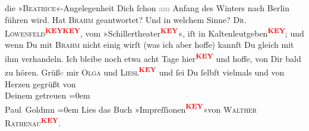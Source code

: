 \begin{ledgroupsized}[t]{13cm}
                    die »\textsc{Beatrice}«-Angelegenheit {\pb} Dich ſchon
                        \textcolor{gray}{am} Anfang des Winters nach Berlin führen wird. Hat \textsc{Brahm} geantwortet? Und in welchem Sinne? \textsc{Dr. Löwenfeld\textcolor{red}{\textsuperscript{\textbf{KEY}}}}\textcolor{red}{\textsuperscript{\textbf{KEY}}}, vom »Schillertheater\textcolor{red}{\textsuperscript{\textbf{KEY}}}«,
                    iſt in Kaltenleutgeben\textcolor{red}{\textsuperscript{\textbf{KEY}}}; und wenn Du mit \textsc{Brahm} nicht einig wirſt (was ich aber hoffe) kannſt Du gleich mit ihm
                    verhandeln. \pend
           \pstart
           Ich bleibe noch etwa acht Tage hier\textcolor{red}{\textsuperscript{\textbf{KEY}}} und hoffe,
                    von Dir bald zu hören. {\pb}
                        Grüß\textcolor{gray}{e} mir \textsc{Olga} und \textsc{Liesl\textcolor{red}{\textsuperscript{\textbf{KEY}}}} und ſei Du ſelbſt vielmals und von Herzen gegrüßt von {\\[\baselineskip]}Deinem
                    getreuen\pend
           \leftskip=0em{}\pstart
           {\\[\baselineskip]}\spacefill\mbox{Paul Goldmn}\pend
           \leftskip=0em{}\pstart
           Lies das Buch »Impreſſionen\textcolor{red}{\textsuperscript{\textbf{KEY}}}«von \textsc{Walther Rathenau\textcolor{red}{\textsuperscript{\textbf{KEY}}}}. \pend
           
         
         \endnumbering{}\end{ledgroupsized}\begin{anhang}\end{anhang}\newcommand{\dateiname}{L03214}\newcommand{\titel}{Paul Goldmann an Arthur Schnitzler, 25. 7. [1902]}\newcommand{\editorInnen}{Martin Anton Müller und Laura Untner}
      